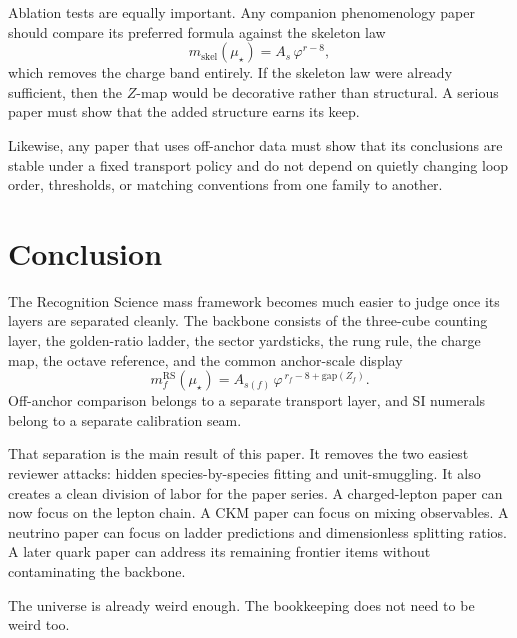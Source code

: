 \documentclass[11pt]{article}
\newcommand{\phig}{\varphi}
\newcommand{\mustar}{\mu_\star}
\begin{document}
Ablation tests are equally important. Any companion phenomenology paper should compare its preferred formula against the skeleton law
\[
  m_{\mathrm{skel}}(\mustar)=A_s\,\phig^{r-8},
\]
which removes the charge band entirely. If the skeleton law were already sufficient, then the \(Z\)-map would be decorative rather than structural. A serious paper must show that the added structure earns its keep.

Likewise, any paper that uses off-anchor data must show that its conclusions are stable under a fixed transport policy and do not depend on quietly changing loop order, thresholds, or matching conventions from one family to another.

\section{Conclusion}

The Recognition Science mass framework becomes much easier to judge once its layers are separated cleanly. The backbone consists of the three-cube counting layer, the golden-ratio ladder, the sector yardsticks, the rung rule, the charge map, the octave reference, and the common anchor-scale display
\[
  m_f^{\mathrm{RS}}(\mustar)=A_{s(f)}\,\phig^{\,r_f-8+\mathrm{gap}(Z_f)}.
\]
Off-anchor comparison belongs to a separate transport layer, and SI numerals belong to a separate calibration seam.

That separation is the main result of this paper. It removes the two easiest reviewer attacks: hidden species-by-species fitting and unit-smuggling. It also creates a clean division of labor for the paper series. A charged-lepton paper can now focus on the lepton chain. A CKM paper can focus on mixing observables. A neutrino paper can focus on ladder predictions and dimensionless splitting ratios. A later quark paper can address its remaining frontier items without contaminating the backbone.

The universe is already weird enough. The bookkeeping does not need to be weird too.
\end{document}
